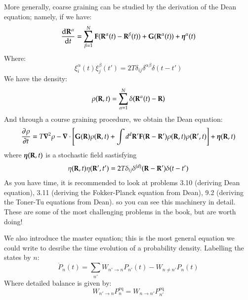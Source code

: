 More generally, coarse graining can be studied by the derivation of the Dean equation; namely, if we have:
\begin{equation}
    \frac{\text{d}\mathbf{R}^{\alpha}}{\text{d}t} = \sum_{\beta=1}^{N}\mathbf{F}(\mathbf{R}^\alpha(t) - \mathbf{R}^{\beta}(t)) + \mathbf{G}(\mathbf{R}^{\alpha}(t)) + \mbox{\boldmath$ \eta $}^\alpha(t)
\end{equation}
Where:
\begin{equation}
    \xi^\alpha_i(t)\xi^\beta_j(t') = 2T\delta_{ij}\delta^{\alpha\beta}\delta(t-t')
\end{equation}
We have the density:
\begin{equation}
    \rho(\mathbf{R}, t) = \sum_{\alpha=1}^N\delta(\mathbf{R}^\alpha(t) - \mathbf{R})
\end{equation}
And through a course graining procedure, we obtain the Dean equation:
\begin{equation}
    \dpd{\rho}{t} = T\nabla^2 \rho - \nabla \cdot \left[\v{G}(\v{R})\rho(\v{R}, t) + \int d^d \v{R}'\v{F}(\v{R} - \v{R}')\rho(\v{R}, t)\rho(\v{R}', t)\right] + \gv{\eta}(\v{R}, t)
\end{equation}
where $\mbox{\boldmath$ \eta $}(\mathbf{R}, t)$ is a stochastic field sastisfying
\begin{equation}
    \eta(\mathbf{R}, t)\eta(\mathbf{R}', t') = 2T \delta_{ij}\delta^{(d)}(\mathbf{R} - \mathbf{R}')\delta(t-t')
\end{equation}
As you have time, it is recommended to look at problems 3.10 (deriving Dean equation), 3.11 (deriving the Fokker-Planck equation from Dean), 9.2 (deriving the Toner-Tu equations from Dean). so you can see this machinery in detail. These are some of the most challenging problems in the book, but are worth doing!

We also introduce the master equation; this is the most general equation we could write to desribe the time evolution of a probability density. Labelling the states by $n$:
\begin{equation}
    \dot{P}_n(t) = \sum_{n'}W_{n'\to n}P_{n'}(t) - W_{n\neq n'}P_n(t)
\end{equation}
Where detailed balance is given by:
\begin{equation}
    W_{n'\to n}P^{\text{eq}}_n = W_{n\to n'}P^{\text{eq}}_{n'}
\end{equation}

